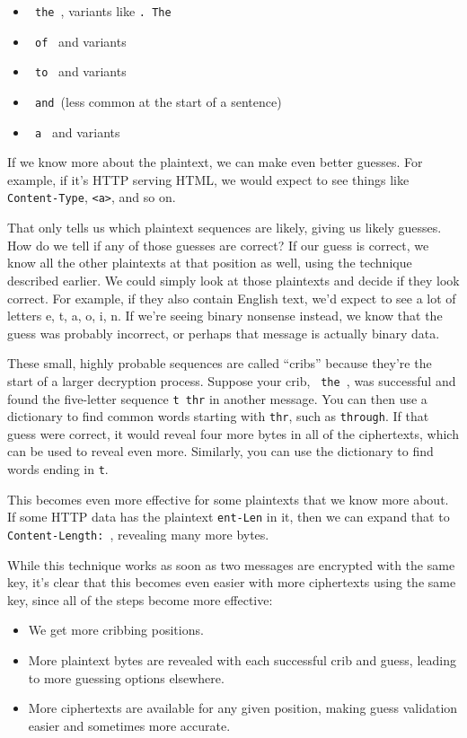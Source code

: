 \documentclass[11pt,ebook,table,dvipsnames]{memoir}
\begin{document}
\begin{itemize}
\item \verb*| the |, variants like \verb*|. The |
\item \verb*| of | and variants
\item \verb*| to | and variants
\item \verb*| and |(less common at the start of a sentence)
\item \verb*| a | and variants
\end{itemize}

If we know more about the plaintext, we can make even better guesses.
For example, if it's HTTP serving HTML, we would expect to see things
like \texttt{Content-Type}, \texttt{<a>}, and so on.

That only tells us which plaintext sequences are likely, giving us
likely guesses. How do we tell if any of those guesses are correct? If
our guess is correct, we know all the other plaintexts at that
position as well, using the technique described earlier. We could
simply look at those plaintexts and decide if they look correct. For
example, if they also contain English text, we'd expect to see a lot
of letters e, t, a, o, i, n. If we're seeing binary nonsense instead,
we know that the guess was probably incorrect, or perhaps that message
is actually binary data.

These small, highly probable sequences are called \enquote{cribs} because
they're the start of a larger decryption process. Suppose your crib,
\verb*| the |, was successful and found the five-letter sequence
\verb*|t thr| in another message. You can then use a dictionary to
find common words starting with \texttt{thr}, such as \texttt{through}. If that
guess were correct, it would reveal four more bytes in all of the
ciphertexts, which can be used to reveal even more. Similarly, you can
use the dictionary to find words ending in \texttt{t}.

This becomes even more effective for some plaintexts that we know more
about. If some HTTP data has the plaintext \texttt{ent-Len} in it, then we
can expand that to \verb*|Content-Length: |, revealing many more
bytes.

While this technique works as soon as two messages are encrypted with
the same key, it's clear that this becomes even easier with more
ciphertexts using the same key, since all of the steps become more
effective:

\begin{itemize}
\item We get more cribbing positions.
\item More plaintext bytes are revealed with each successful crib and
guess, leading to more guessing options elsewhere.
\item More ciphertexts are available for any given position, making guess
validation easier and sometimes more accurate.
\end{itemize}
\end{document}
